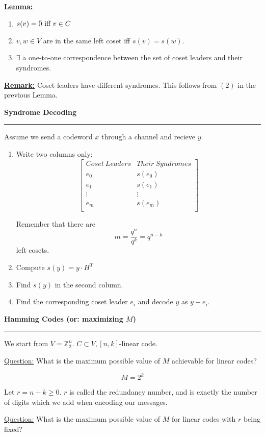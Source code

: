 \documentclass{article}
\newcommand{\header}[1]{
	\begin{Large}
	\noindent\textbf{#1}
	\vspace{2pt}
	\hrule
	\vspace{16pt}
	\end{Large}
	\normalsize
}
\renewcommand{\b}[1]{\textbf{#1}}
\newcommand{\ul}[1]{\underline{#1}}
\newcommand{\newdef}[2]{\b{\ul{#1:}} #2}
\renewcommand{\iff}{\textnormal{ iff }}
\begin{document}
\newdef{Lemma}{
	\begin{enumerate}
		\item $s(v) = \bar{0} \iff v \in C$
		\item $v, w \in V $ are in the same left coset iff
		      $s(v) = s(w)$.
		\item $\exists$ a one-to-one correspondence between the set of
		      coset leaders and their syndromes.
	\end{enumerate}
}

\newdef{Remark}{
	Coset leaders have different syndromes. This follows from $(2)$ in the
	previous Lemma.
}

\header{Syndrome Decoding}

Assume we send a codeword $x$ through a channel and recieve $y$.
\begin{enumerate}
	\item Write two columns only:
	      \[
		      \begin{bmatrix}
			      Coset\ Leaders & Their\ Syndromes \\
			      e_0            & s(e_0)           \\
			      e_1            & s(e_1)           \\
			      \vdots         & \vdots           \\
			      e_m            & s(e_m)           \\
		      \end{bmatrix}
	      \]

	      Remember that there are \[m = \frac{q^n}{q^k} = q^{n-k}\] left
	      cosets.
	\item Compute $s(y) = y \cdot H^T$
	\item Find $s(y)$ in the second column.
	\item Find the corresponding coset leader $e_i$ and decode $y$ as
	      $y - e_i$.
\end{enumerate}

\header{Hamming Codes (or: maximizing $M$)}

We start from $V = \mathbb{Z}^n_2$. $C \subset V, [n, k]$-linear code.

\ul{Question:} What is the maximum possible value of $M$ achievable for linear
codes?

\[M = 2^k\]

Let $r = n-k \geq 0$. $r$ is called the redundancy number, and is exactly the
number of digits which we add when encoding our messages.

\ul{Question:} What is the maximum possible value of $M$ for linear codes with
$r$ being fixed?
\end{document}
